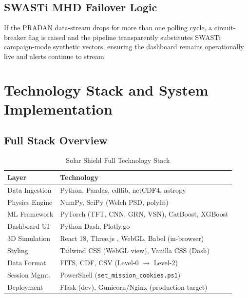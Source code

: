 \documentclass[conference,10pt,twocolumn]{IEEEtran}
\begin{document}
\subsection{SWASTi MHD Failover Logic}
If the PRADAN data-stream drops for more than one polling cycle, a circuit-breaker flag is raised and the pipeline transparently substitutes SWASTi campaign-mode synthetic vectors, ensuring the dashboard remains operationally live and alerts continue to stream.

\section{Technology Stack and System Implementation}

\subsection{Full Stack Overview}
\begin{table}[htbp]
\caption{Solar Shield Full Technology Stack}
\begin{center}
\renewcommand{\arraystretch}{1.2}
\begin{tabular}{@{}l l@{}}
\toprule
\textbf{Layer} & \textbf{Technology} \\
\midrule
Data Ingestion   & Python, Pandas, cdflib, netCDF4, astropy \\
Physics Engine   & NumPy, SciPy (Welch PSD, polyfit) \\
ML Framework     & PyTorch (TFT, CNN, GRN, VSN), CatBoost, XGBoost \\
Dashboard UI     & Python Dash, Plotly.go \cite{b38} \\
3D Simulation    & React 18, Three.js \cite{b37}, WebGL, Babel (in-browser) \\
Styling          & Tailwind CSS (WebGL view), Vanilla CSS (Dash) \\
Data Format      & FITS, CDF, CSV (Level-0 $\to$ Level-2) \\
Session Mgmt.    & PowerShell (\texttt{set\_mission\_cookies.ps1}) \\
Deployment       & Flask (dev), Gunicorn/Nginx (production target) \\
\bottomrule
\end{tabular}
\label{tab:stack}
\end{center}
\end{table}
\end{document}

